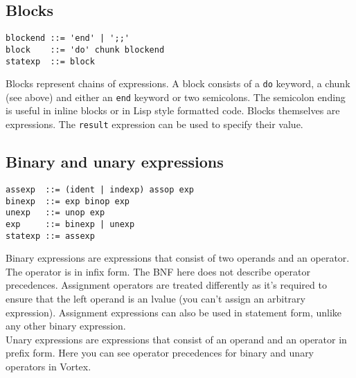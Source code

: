 \documentclass{article}
\begin{document}
\subsection{Blocks}
\begin{lstlisting}[language=bnf]
blockend ::= 'end' | ';;'
block    ::= 'do' chunk blockend
statexp  ::= block
\end{lstlisting}
Blocks represent chains of expressions. A block consists of a \verb|do|
keyword, a chunk (see above) and either an \verb|end| keyword or two
semicolons. The semicolon ending is useful in inline blocks or in
Lisp style formatted code. Blocks themselves are expressions. The \verb|result|
expression can be used to specify their value.
\subsection{Binary and unary expressions}
\begin{lstlisting}[language=bnf]
assexp  ::= (ident | indexp) assop exp
binexp  ::= exp binop exp
unexp   ::= unop exp
exp     ::= binexp | unexp
statexp ::= assexp
\end{lstlisting}
Binary expressions are expressions that consist of two operands and an
operator. The operator is in infix form. The BNF here does not describe
operator precedences. Assignment operators are treated differently as
it's required to ensure that the left operand is an lvalue (you can't
assign an arbitrary expression). Assignment expressions can also be used in
statement form, unlike any other binary expression.\\
Unary expressions are expressions that consist of an operand and an operator
in prefix form.
Here you can see operator precedences for binary and unary operators in Vortex.
\end{document}
